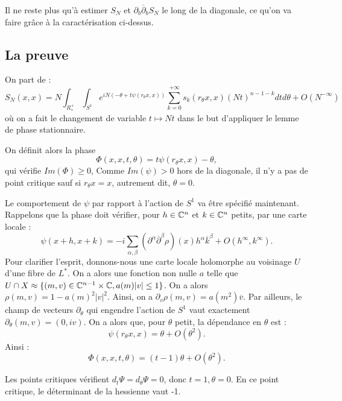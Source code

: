 Il ne reste plus qu'à estimer $S_N$ et $\partial_b \overline{\partial}_bS_N$ le long de la diagonale, ce qu'on va faire grâce à la caractérisation ci-dessus.

\subsection{La preuve}
On part de :
\begin{equation*}
	S_N(x,x)=N\int_{R^+_*}\int_{S^1}e^{iN(-\theta + t\psi(r_{\theta}x,x))}\sum_{k=0}^{+\infty}s_k(r_{\theta}x,x)(Nt)^{n-1-k}dtd\theta + O(N^{-\infty})
\end{equation*}
où on a fait le changement de variable $t \mapsto Nt$ dans le but d'appliquer le lemme de phase stationnaire.

On définit alors la phase
\begin{equation*}
	\Phi(x,x,t,\theta)=t\psi(r_{\theta}x,x)-\theta,
\end{equation*}
qui vérifie $Im(\Phi) \geq 0$, Comme $Im(\psi) > 0$ hors de la diagonale, il n'y a pas de point critique sauf si $r_{\theta}x=x$, autrement dit, $\theta=0$.

Le comportement de $\psi$ par rapport à l'action de $S^1$ va être spécifié maintenant. Rappelons que la phase doit vérifier, pour $h\in \mathbb{C}^n$ et $k \in \mathbb{C}^n$ petits, par une carte locale :
\begin{equation}
  \psi(x+h,x+k) =-i\sum_{\alpha,\beta}(\partial^{\alpha}\overline{\partial}^{\beta}\rho)(x)h^{\alpha}\overline{k}^{\beta} + O(h^{\infty},k^{\infty}).
\end{equation}
Pour clarifier l'esprit, donnons-nous une carte locale holomorphe au voisinage $U$ d'une fibre de $L^*$. On a alors une fonction non nulle $a$ telle que $U \cap X \approx \{(m,v)\in \mathbb{C}^{n-1}\times \mathbb{C}, a(m)|v|\leq 1\}$. On a alors $\rho(m,v)=1-a(m)^2|v|^2$. Ainsi, on a $\partial_v \rho(m,v) = a(m^2)\overline{v}$.
Par ailleurs, le champ de vecteurs $\partial_{\theta}$ qui engendre l'action de $S^1$ vaut exactement $\partial_{\theta}(m,v)=(0,iv)$. On a alors que, pour $\theta$ petit, la dépendance en $\theta$ est :
\begin{equation*}
  \psi(r_{\theta} x,x) = \theta + O(\theta^{2}).
\end{equation*}
 Ainsi :
\begin{equation*}
	\Phi(x,x,t,\theta) =(t-1)\theta + O(\theta^2).
\end{equation*}

Les points critiques vérifient $d_t\Psi = d_\theta \Psi =0$, donc $t=1, \theta=0$. En ce point critique, le déterminant de la hessienne vaut -1.

